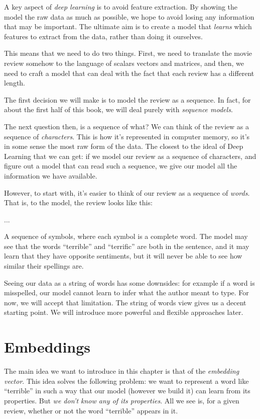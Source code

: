 \documentclass{pca}
\theoremstyle{theorem}
\theoremstyle{definition}
\theoremstyle{proof}
\begin{document}
A key aspect of \emph{deep learning} is to avoid feature extraction. By showing the model the raw data as much as possible, we hope to avoid losing any information that may be important. The ultimate aim is to create a model that \emph{learns} which features to extract from the data, rather than doing it ourselves.

This means that we need to do two things. First, we need to translate the movie review somehow to the language of scalars vectors and matrices, and then, we need to craft a model that can deal with the fact that each review has a different length.

The first decision we will make is to model the review as a sequence. In fact, for about the first half of this book, we will deal purely with \emph{sequence models}.

The next question then, is a sequence of what? We can think of the review as a sequence of \emph{characters}. This is how it's represented in computer memory, so it's in some sense the most raw form of the data. The closest to the ideal of Deep Learning that we can get: if we model our review as a sequence of characters, and figure out a model that can read such a sequence, we give our model all the information we have available.

However, to start with, it's easier to think of our review as a sequence of \emph{words}. That is, to the model, the review looks like this:

...

A sequence of symbols, where each symbol is a complete word. The model may see that the words ``terrible'' and ``terrific'' are both in the sentence, and it may learn that they have opposite sentiments, but it will never be able to see how similar their spellings are.

Seeing our data as a string of words has some downsides: for example if a word is misspelled, our model cannot learn to infer what the author meant to type. For now, we will accept that limitation. The string of words view gives us a decent starting point. We will introduce more powerful and flexible approaches later. 


\section{Embeddings}

The main idea we want to introduce in this chapter is that of the \emph{embedding vector}. This idea solves the following problem: we want to represent a word like ``terrible'' in such a way that our model (however we build it) can learn from its properties. But \emph{we don't know any of its properties}. All we see is, for a given review, whether or not the word ``terrible'' appears in it. 
\end{document}
